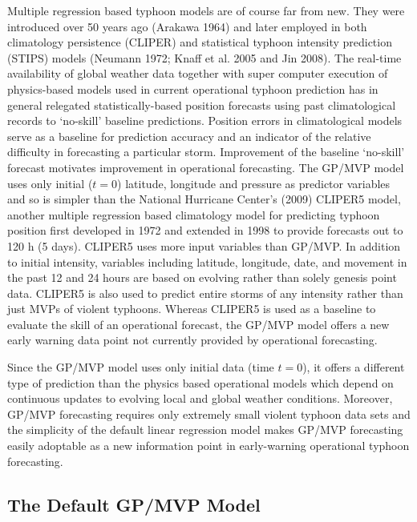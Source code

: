 \documentclass[a4paper, 12pt]{article}
\begin{document}
{    Multiple regression based typhoon models are of course far from new. They were introduced over 50 years ago (Arakawa 1964) and later employed in  both climatology persistence (CLIPER) and statistical typhoon intensity prediction (STIPS) models (Neumann 1972; Knaff et al. 2005 and Jin 2008). The real-time availability of global weather data together with super computer execution of physics-based models used in  current operational typhoon prediction has in general relegated statistically-based position forecasts using past climatological records to `no-skill' baseline predictions.  Position errors in climatological models serve as a baseline for prediction accuracy and an indicator of the relative difficulty in forecasting a particular storm. Improvement of the baseline `no-skill' forecast motivates improvement in operational forecasting. The GP/MVP model uses only initial ($t=0$) latitude, longitude and pressure as predictor variables and so is simpler than the National Hurricane Center's (2009) CLIPER5 model, another multiple regression based climatology model for predicting typhoon position first developed in 1972 and extended in 1998 to provide forecasts out to 120 h (5 days). CLIPER5 uses more input variables than GP/MVP.  In addition to initial intensity, variables including latitude, longitude, date, and movement in the past 12 and 24 hours are based on evolving rather than solely genesis point data. CLIPER5 is also used to predict entire storms of any intensity  rather than just MVPs of violent typhoons. Whereas CLIPER5 is used as a baseline to evaluate the skill of an operational forecast, the GP/MVP model offers a new early warning data point not currently provided by operational forecasting.

    Since the GP/MVP model uses only initial data (time $t=0$), it offers a different type of prediction than the physics based operational models which depend on continuous updates to evolving local and global weather conditions.  Moreover,  GP/MVP forecasting requires only extremely small violent typhoon data sets and the simplicity of the default linear regression model makes  GP/MVP forecasting easily adoptable as a new information point in early-warning operational typhoon forecasting.



\subsection{The Default GP/MVP Model}

}
\end{document}
